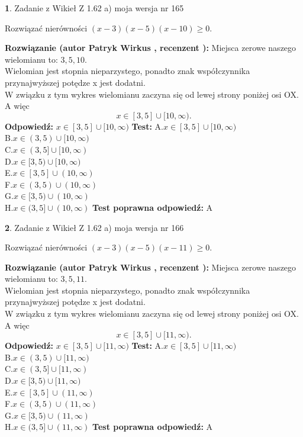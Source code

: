 \documentclass[12pt, a4paper]{article}
\theoremstyle{definition} %
\newtheorem{zad}{}
\newcommand{\zadStart}[1]{\begin{zad}#1\newline}
\newcommand{\zadStop}{\end{zad}}
\newcommand{\rozwStart}[2]{\noindent \textbf{Rozwiązanie (autor #1 , recenzent #2): }\newline}
\newcommand{\rozwStop}{\newline}
\newcommand{\odpStart}{\noindent \textbf{Odpowiedź:}\newline}
\newcommand{\odpStop}{\newline}
\newcommand{\testStart}{\noindent \textbf{Test:}\newline}
\newcommand{\testStop}{\newline}
\newcommand{\kluczStart}{\noindent \textbf{Test poprawna odpowiedź:}\newline}
\newcommand{\kluczStop}{\newline}
\begin{document}
\zadStart{Zadanie z Wikieł Z 1.62 a) moja wersja nr 165}

Rozwiązać nierówności $(x-3)(x-5)(x-10)\ge0$.
\zadStop
\rozwStart{Patryk Wirkus}{}
Miejsca zerowe naszego wielomianu to: $3, 5, 10$.\\
Wielomian jest stopnia nieparzystego, ponadto znak współczynnika przy\linebreak najwyższej potędze x jest dodatni.\\ W związku z tym wykres wielomianu zaczyna się od lewej strony poniżej osi OX. A więc $$x \in [3,5] \cup [10,\infty).$$
\rozwStop
\odpStart
$x \in [3,5] \cup [10,\infty)$
\odpStop
\testStart
A.$x \in [3,5] \cup [10,\infty)$\\
B.$x \in (3,5) \cup [10,\infty)$\\
C.$x \in (3,5] \cup [10,\infty)$\\
D.$x \in [3,5) \cup [10,\infty)$\\
E.$x \in [3,5] \cup (10,\infty)$\\
F.$x \in (3,5) \cup (10,\infty)$\\
G.$x \in [3,5) \cup (10,\infty)$\\
H.$x \in (3,5] \cup (10,\infty)$
\testStop
\kluczStart
A
\kluczStop



\zadStart{Zadanie z Wikieł Z 1.62 a) moja wersja nr 166}

Rozwiązać nierówności $(x-3)(x-5)(x-11)\ge0$.
\zadStop
\rozwStart{Patryk Wirkus}{}
Miejsca zerowe naszego wielomianu to: $3, 5, 11$.\\
Wielomian jest stopnia nieparzystego, ponadto znak współczynnika przy\linebreak najwyższej potędze x jest dodatni.\\ W związku z tym wykres wielomianu zaczyna się od lewej strony poniżej osi OX. A więc $$x \in [3,5] \cup [11,\infty).$$
\rozwStop
\odpStart
$x \in [3,5] \cup [11,\infty)$
\odpStop
\testStart
A.$x \in [3,5] \cup [11,\infty)$\\
B.$x \in (3,5) \cup [11,\infty)$\\
C.$x \in (3,5] \cup [11,\infty)$\\
D.$x \in [3,5) \cup [11,\infty)$\\
E.$x \in [3,5] \cup (11,\infty)$\\
F.$x \in (3,5) \cup (11,\infty)$\\
G.$x \in [3,5) \cup (11,\infty)$\\
H.$x \in (3,5] \cup (11,\infty)$
\testStop
\kluczStart
A
\kluczStop
\end{document}
